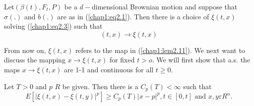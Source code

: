 \setcounter{lemma}{10}
\begin{lemma}\label{chap1:lem2.11} %
  Let\pageoriginale $(\beta(t),F_t,P)$ be a $d-$dimensional Brownian
  motion and suppose that $\sigma(.)$ and $b(.)$ are as in
  (\ref{chap1:eq2.1}). Then   there is a choice of $\xi(t,x)$ solving
  (\ref{chap1:eq2.3}) such that   
$$
(t,x) \to \xi (t,x)
$$ 
\end{lemma}

From now on, $\xi(t,x)$ refers to the map in (\ref{chap1:lem2.11}). We
next want to  
discuss the mapping $x \to \xi(t,x)$ for fixed $t>o$. We will first
show that a.s. the maps $x \to \xi(t,x)$ are 1-1 and continuous
for all $t\ge 0$. 

\begin{lemma}\label{chap1:lem2.12}%
Let $T>0$ and $p$ $R$ be given. Then there is a $C_p(T)<\infty$ such
that 
\begin{equation*}
E[|\xi (t,x)-\xi (t,y)|^p] \ge C_p(T)|x-p|^p,t \in [0,t] \text{ and }
x,y \varepsilon R^n. \tag{2.13}\label{chap1:eq2.13}   
\end{equation*}
\end{lemma}


